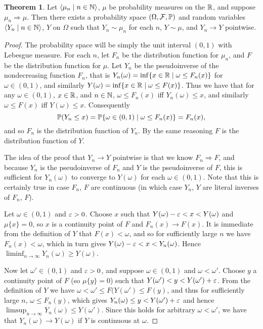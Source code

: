 \documentclass{article}
\theoremstyle{definition}
\newtheorem{theorem}{Theorem}[section]
\newcommand{\bldset}[2]{\{{#1}\mid{#2}\}}
\newcommand{\bldseq}[2]{\langle{#1}\mid{#2}\rangle}
\begin{document}
\begin{theorem}
Let $\bldseq{\mu_n}{n \in \N}$, $\mu$ be probability measures on the $\R$, and suppose $\mu_n \Rightarrow \mu$. Then there exists a probability space $(\Omega, \mathcal F, \P)$ and random variables $\bldseq{Y_n}{n \in \N}$, $Y$ on $\Omega$ such that $Y_n \sim \mu_n$ for each $n$, $Y \sim \mu$, and $Y_n \rightarrow Y$ pointwise.
\end{theorem}

\begin{proof}
The probability space will be simply the unit interval $(0,1)$ with Lebesgue measure. For each $n$, let $F_n$ be the distribution function for $\mu_n$, and $F$ be the distribution function for $\mu$. Let $Y_n$ be the pseudoinverse of the nondecreasing function $F_n$, that is $Y_n(\omega) = \inf \bldset{x \in \R}{\omega \le F_n(x)}$ for $\omega \in (0,1)$, and similarly $Y(\omega) = \inf \bldset{x \in \R}{\omega \le F(x)}$. Thus we have that for any $\omega \in (0,1)$, $x \in \R$, and $n \in \N$, $\omega \le F_n(x)$ iff $Y_n(\omega) \le x$, and similarly $\omega \le F(x)$ iff $Y(\omega) \le x$. Consequently
\[ \P(Y_n \le x) = \P \bldset{\omega \in (0,1)}{\omega \le F_n(x)} = F_n(x), \]
and so $F_n$ is the distribution function of $Y_n$. By the same reasoning $F$ is the distribution function of $Y$.

The idea of the proof that $Y_n \rightarrow Y$ pointwise is that we know $F_n \Rightarrow F$, and because $Y_n$ is the pseudoinverse of $F_n$ and $Y$ is the pseudoinverse of $F$, this is sufficient for $Y_n(\omega)$ to converge to $Y(\omega)$ for each $\omega \in (0,1)$. Note that this is certainly true in case $F_n$, $F$ are continuous (in which case $Y_n$, $Y$ are literal inverses of $F_n$, $F$).

Let $\omega \in (0,1)$ and $\eps > 0$. Choose $x$ such that $Y(\omega) - \eps < x < Y(\omega)$ and $\mu \{x\} = 0$, so $x$ is a continuity point of $F$ and $F_n(x) \rightarrow F(x)$. It is immediate from the definition of $Y$ that $F(x) < \omega$, and so for sufficiently large $n$ we have $F_n(x) < \omega$, which in turn gives $Y(\omega) - \eps < x < Y_n(\omega)$. Hence $\liminf_{n \rightarrow \infty} Y_n(\omega) \ge Y(\omega)$.

Now let $\omega' \in (0,1)$ and $\eps > 0$, and suppose $\omega \in (0,1)$ and $\omega < \omega'$. Choose $y$ a continuity point of $F$ (so $\mu \{y\} = 0$) such that $Y(\omega') < y < Y(\omega') + \eps$. From the definition of $Y$ we have $\omega < \omega' \le F(Y(\omega') \le F(y)$, and thus for sufficiently large $n$, $\omega \le F_n(y)$, which gives $Y_n(\omega) \le y < Y(\omega') + \eps$ and hence $\limsup_{n \rightarrow \infty} Y_n(\omega) \le Y(\omega')$. Since this holds for arbitrary $\omega < \omega'$, we have that $Y_n(\omega) \rightarrow Y(\omega)$ if $Y$ is continuous at $\omega$.


\end{proof}
\end{document}
